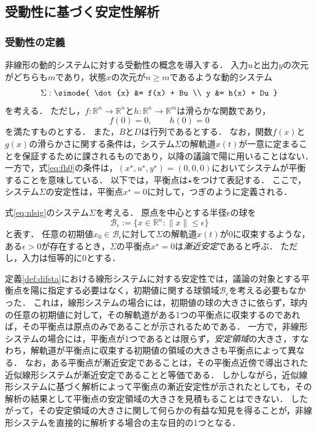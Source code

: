 \documentclass[a4j,10pt,oneside,openany,dvipdfmx]{jsbook}
\begin{document}
\subsection{受動性に基づく安定性解析}

\subsubsection{受動性の定義}

非線形の動的システムに対する受動性の概念を導入する．
入力$u$と出力$y$の次元がどちらも$m$であり，状態$x$の次元が$n\geq m$であるような動的システム
\begin{equation}\label{eq:nlsig}
\Sigma: \simode{
\dot{x} &= f(x) + Bu \\
y &= h(x) + Du
}
\end{equation}
を考える．
ただし，$f:\mathbb{R}^{n} \rightarrow \mathbb{R}^{n}$と$h:\mathbb{R}^{n} \rightarrow \mathbb{R}^{m}$は滑らかな関数であり，
\begin{equation}\label{eq:fh0}
f(0)=0,\qquad
h(0)=0
\end{equation}
を満たすものとする．
また，$B$と$D$は行列であるとする．
なお，関数$f(x)$と$g(x)$の滑らかさに関する条件は，システム$\Sigma$の解軌道$x(t)$が一意に定まることを保証するために課されるものであり，以降の議論で陽に用いることはない．
一方で，式\eqref{eq:fh0}の条件は，$(x^{\star},u^{\star},y^{\star})=(0,0,0)$においてシステムが平衡することを意味している．
以下では，平衡点は$\star$をつけて表記する．
ここで，システム$\Sigma$の安定性は，平衡点$x^{\star}=0$に対して，つぎのように定義される．

\begin{definition}\label{def:stabnl}
式\eqref{eq:nlsig}のシステム$\Sigma$を考える．
原点を中心とする半径$\epsilon$の球を
\[
\mathcal{B}_{\epsilon} := \{
x \in \mathbb{R}^n : \|x\|\leq \epsilon
\}
\]
と表す．
任意の初期値$x_0 \in \mathcal{B}_{\epsilon}$に対して$\Sigma$の解軌道$x(t)$が0に収束するような，ある$\epsilon>0$が存在するとき，$\Sigma$の平衡点$x^{\star}=0$は\emph{漸近安定}であると呼ぶ．
ただし，入力は恒等的に0とする．
\end{definition}

定義\ref{def:difsta}における線形システムに対する安定性では，議論の対象とする平衡点を陽に指定する必要はなく，初期値に関する球領域$\mathcal{B}_{\epsilon}$を考える必要もなかった．
これは，線形システムの場合には，初期値の球の大きさに依らず，球内の任意の初期値に対して，その解軌道がある1つの平衡点に収束するのであれば，その平衡点は原点のみであることが示されるためである．
一方で，非線形システムの場合には，平衡点が1つであるとは限らず，\emph{安定領域}の大きさ，すなわち，解軌道が平衡点に収束する初期値の領域の大きさも平衡点によって異なる．
なお，ある平衡点が漸近安定であることは，その平衡点近傍で導出された近似線形システムが漸近安定であることと等価である．
しかしながら，近似線形システムに基づく解析によって平衡点の漸近安定性が示されたとしても，その解析の結果として平衡点の安定領域の大きさを見積もることはできない．
したがって，その安定領域の大きさに関して何らかの有益な知見を得ることが，非線形システムを直接的に解析する場合の主な目的の1つとなる．
\end{document}
